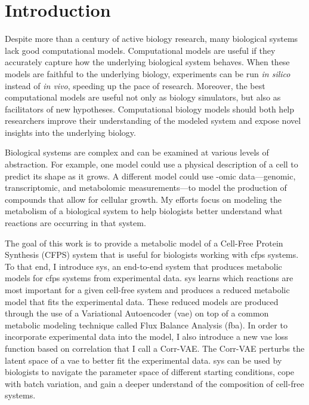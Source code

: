 \chapter{Introduction}
\setcounter{page}{1} 

Despite more than a century of active biology research, many biological systems lack good computational models.
Computational models are useful if they accurately capture how the underlying biological system behaves.
When these models are faithful to the underlying biology, experiments can be run \textit{in silico} instead of \textit{in vivo}, speeding up the pace of research.
Moreover, the best computational models are useful not only as biology simulators, but also as facilitators of new hypotheses.
Computational biology models should both help researchers improve their understanding of the modeled system and expose novel insights into the underlying biology.

Biological systems are complex and can be examined at various levels of abstraction.
For example, one model could use a physical description of a cell to predict its shape as it grows.
A different model could use -omic data---genomic, transcriptomic, and metabolomic measurements---to model the production of compounds that allow for cellular growth.
My efforts focus on modeling the metabolism of a biological system to help biologists better understand what reactions are occurring in that system.

The goal of this work is to provide a metabolic model of a Cell-Free Protein Synthesis (CFPS) system that is useful for biologists working with \gls{cfps} systems.
To that end, I introduce \gls{sys}, an end-to-end system that produces metabolic models for \gls{cfps} systems from experimental data.
\gls{sys} learns which reactions are most important for a given cell-free system and produces a reduced metabolic model that fits the experimental data.
These reduced models are produced through the use of a Variational Autoencoder (\gls{vae}) on top of a common metabolic modeling technique called Flux Balance Analysis (\gls{fba}).
In order to incorporate experimental data into the model, I also introduce a new \gls{vae} loss function based on correlation that I call a Corr-VAE.
The Corr-VAE perturbs the latent space of a \gls{vae} to better fit the experimental data.
\gls{sys} can be used by biologists to navigate the parameter space of different starting conditions, cope with batch variation, and gain a deeper understand of the composition of cell-free systems.

